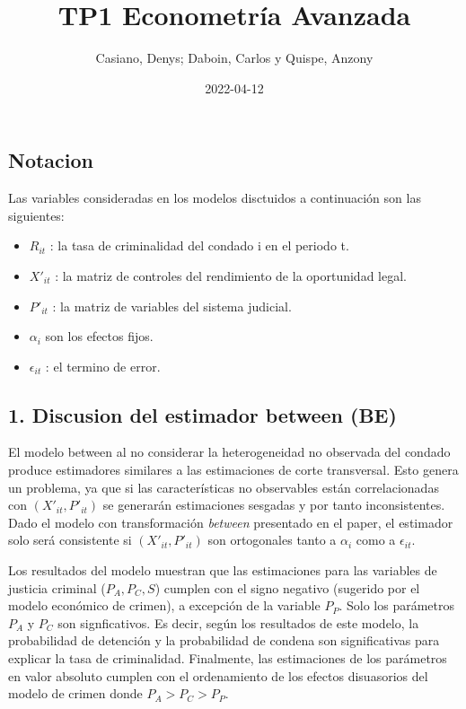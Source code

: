 \documentclass[
]{article}
\title{TP1 Econometría Avanzada}
\author{Casiano, Denys; Daboin, Carlos y Quispe, Anzony}
\date{2022-04-12}
\providecommand{\tightlist}{%
  \setlength{\itemsep}{0pt}\setlength{\parskip}{0pt}}
\begin{document}
\maketitle

\hypertarget{notacion}{%
\subsection{Notacion}\label{notacion}}

Las variables consideradas en los modelos disctuidos a continuación son
las siguientes:

\begin{itemize}
\tightlist
\item
  \(R_{it}\) : la tasa de criminalidad del condado i en el periodo t.
\item
  \(X'_{it}\) : la matriz de controles del rendimiento de la oportunidad
  legal.
\item
  \(P'_{it}\) : la matriz de variables del sistema judicial.
\item
  \(\alpha_{i}\) son los efectos fijos.
\item
  \(\epsilon_{it}\) : el termino de error.
\end{itemize}

\hypertarget{discusion-del-estimador-between-be}{%
\subsection{1. Discusion del estimador between
(BE)}\label{discusion-del-estimador-between-be}}

El modelo between al no considerar la heterogeneidad no observada del
condado produce estimadores similares a las estimaciones de corte
transversal. Esto genera un problema, ya que si las características no
observables están correlacionadas con \((X'_{it},P'_{it})\) se generarán
estimaciones sesgadas y por tanto inconsistentes. Dado el modelo con
transformación \emph{between} presentado en el paper, el estimador solo
será consistente si \((X'_{it},P'_{it})\) son ortogonales tanto a
\(\alpha_i\) como a \(\epsilon_{it}\).

Los resultados del modelo muestran que las estimaciones para las
variables de justicia criminal (\(P_A, P_C, S\)) cumplen con el signo
negativo (sugerido por el modelo económico de crimen), a excepción de la
variable \(P_P\). Solo los parámetros \(P_A\) y \(P_C\) son
signficativos. Es decir, según los resultados de este modelo, la
probabilidad de detención y la probabilidad de condena son
significativas para explicar la tasa de criminalidad. Finalmente, las
estimaciones de los parámetros en valor absoluto cumplen con el
ordenamiento de los efectos disuasorios del modelo de crimen donde
\(P_A>P_C>P_P\).
\end{document}
